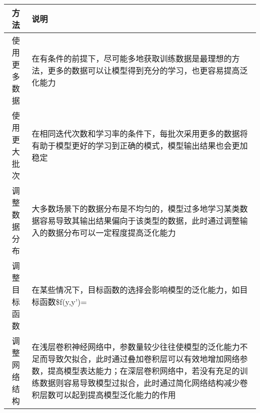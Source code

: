 \begin{longtable}[]{ cl }
\toprule
\begin{minipage}[b]{0.08\columnwidth}\centering\strut
方法\strut
\end{minipage} & \begin{minipage}[b]{0.07\columnwidth}\raggedright\strut
说明\strut
\end{minipage}\tabularnewline
\midrule
\endhead
\begin{minipage}[t]{0.08\columnwidth}\centering\strut
使用更多数据\strut
\end{minipage} & \begin{minipage}[t]{0.07\columnwidth}\raggedright\strut
在有条件的前提下，尽可能多地获取训练数据是最理想的方法，更多的数据可以让模型得到充分的学习，也更容易提高泛化能力\strut
\end{minipage}\tabularnewline
\begin{minipage}[t]{0.08\columnwidth}\centering\strut
使用更大批次\strut
\end{minipage} & \begin{minipage}[t]{0.07\columnwidth}\raggedright\strut
在相同迭代次数和学习率的条件下，每批次采用更多的数据将有助于模型更好的学习到正确的模式，模型输出结果也会更加稳定\strut
\end{minipage}\tabularnewline
\begin{minipage}[t]{0.08\columnwidth}\centering\strut
调整数据分布\strut
\end{minipage} & \begin{minipage}[t]{0.07\columnwidth}\raggedright\strut
大多数场景下的数据分布是不均匀的，模型过多地学习某类数据容易导致其输出结果偏向于该类型的数据，此时通过调整输入的数据分布可以一定程度提高泛化能力\strut
\end{minipage}\tabularnewline
\begin{minipage}[t]{0.08\columnwidth}\centering\strut
调整目标函数\strut
\end{minipage} & \begin{minipage}[t]{0.07\columnwidth}\raggedright\strut
在某些情况下，目标函数的选择会影响模型的泛化能力，如目标函数\$f(y,y')=\strut
\end{minipage}\tabularnewline
\begin{minipage}[t]{0.08\columnwidth}\centering\strut
调整网络结构\strut
\end{minipage} & \begin{minipage}[t]{0.07\columnwidth}\raggedright\strut
在浅层卷积神经网络中，参数量较少往往使模型的泛化能力不足而导致欠拟合，此时通过叠加卷积层可以有效地增加网络参数，提高模型表达能力；在深层卷积网络中，若没有充足的训练数据则容易导致模型过拟合，此时通过简化网络结构减少卷积层数可以起到提高模型泛化能力的作用\strut

\end{minipage}
\end{longtable}

